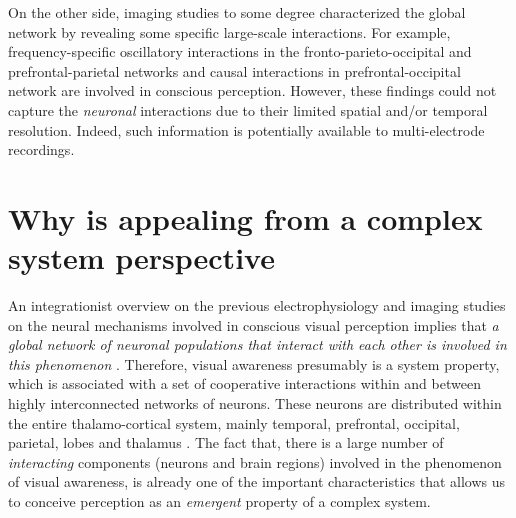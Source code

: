 On the other side, imaging studies to some degree characterized the global network by revealing some specific large-scale interactions. 
For example, frequency-specific oscillatory interactions in the fronto-parieto-occipital \cite{hippOscillatorySynchronizationLargescale2011a}
and prefrontal-parietal networks \cite{doesburgRhythmsConsciousnessBinocular2009b}
and causal interactions in prefrontal-occipital \cite{imamogluChangesFunctionalConnectivity2012} network are involved in conscious perception.
However, these findings could not capture the \emph{neuronal} interactions due to their limited spatial and/or temporal resolution.
Indeed, such information is potentially available to multi-electrode recordings.

\section{Why is appealing from a complex system perspective} \label{sec:why-it-appealing}
An integrationist overview on the previous electrophysiology and imaging studies on the neural mechanisms involved in conscious visual perception implies that \emph{a global network of neuronal populations that interact with each other is involved in this phenomenon} \cite{blakeVisualCompetition2002a,panagiotaropoulosSubjectiveVisualPerception2014a}.
Therefore, visual awareness presumably is  a system property,
which is associated with a set of cooperative interactions within and between highly interconnected networks of neurons. 
These neurons are distributed within the entire thalamo-cortical system, 
mainly temporal, prefrontal,  occipital, parietal, lobes and thalamus 
\cite{blakeVisualCompetition2002a,panagiotaropoulosSubjectiveVisualPerception2014a,wangBrainMechanismsSimple2013,lumerNeuralCorrelatesPerceptual1998,srinivasanIncreasedSynchronizationNeuromagnetic1999b,hippOscillatorySynchronizationLargescale2011a,doesburgRhythmsConsciousnessBinocular2009b,panagiotaropoulosNeuronalDischargesGamma2012,bahmaniNeuralCorrelatesBinocular2011,tononiNeuralCorrelatesConsciousness2008,kochNeuralCorrelatesConsciousness2016,imamogluChangesFunctionalConnectivity2012}. 
The fact that, there is a large number of \emph{interacting} components (neurons and brain regions) involved in the phenomenon of  visual awareness,
is already one of the important characteristics that 
allows us to conceive perception as an \emph{emergent} property of a complex system.

